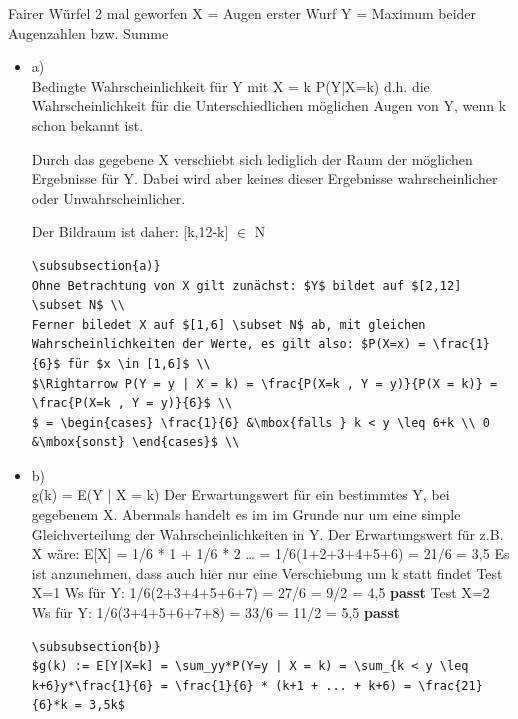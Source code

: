 \documentclass[11pt]{article}
\begin{document}
Fairer Würfel 2 mal geworfen
X = Augen erster Wurf
Y = Maximum beider Augenzahlen bzw. Summe
\begin{itemize}

\item a)\\
\label{sec-3-8-3-1}%
Bedingte Wahrscheinlichkeit für Y mit X = k
P(Y|X=k)
d.h. die Wahrscheinlichkeit für die Unterschiedlichen
möglichen Augen von Y, wenn k schon bekannt ist.

Durch das gegebene X verschiebt sich lediglich der Raum
der möglichen Ergebnisse für Y. Dabei wird aber keines
dieser Ergebnisse wahrscheinlicher oder Unwahrscheinlicher.

Der Bildraum ist daher: [k,12-k] $\in$ N

\begin{verbatim}
\subsubsection{a)}
Ohne Betrachtung von X gilt zunächst: $Y$ bildet auf $[2,12] \subset N$ \\
Ferner biledet X auf $[1,6] \subset N$ ab, mit gleichen Wahrscheinlichkeiten der Werte, es gilt also: $P(X=x) = \frac{1}{6}$ für $x \in [1,6]$ \\
$\Rightarrow P(Y = y | X = k) = \frac{P(X=k , Y = y)}{P(X = k)} = \frac{P(X=k , Y = y)}{6}$ \\
$ = \begin{cases} \frac{1}{6} &\mbox{falls } k < y \leq 6+k \\ 0 &\mbox{sonst} \end{cases}$ \\
\end{verbatim}

\item b)\\
\label{sec-3-8-3-2}%
g(k) = E(Y | X = k) Der Erwartungswert für ein bestimmtes Y, bei gegebenem X.
Abermals handelt es im im Grunde nur um eine simple Gleichverteilung der Wahrscheinlichkeiten in Y.
Der Erwartungswert für z.B. X wäre: E[X] = 1/6 * 1 + 1/6 * 2 \ldots{} = 1/6(1+2+3+4+5+6) = 21/6 = 3,5
Es ist anzunehmen, dass auch hier nur eine Verschiebung um k statt findet
Test X=1 Ws für Y: 1/6(2+3+4+5+6+7) = 27/6 = 9/2 = 4,5  \textbf{passt}
Test X=2 Ws für Y: 1/6(3+4+5+6+7+8) = 33/6 = 11/2 = 5,5 \textbf{passt}

\begin{verbatim}
\subsubsection{b)}
$g(k) := E[Y|X=k] = \sum_yy*P(Y=y | X = k) = \sum_{k < y \leq k+6}y*\frac{1}{6} = \frac{1}{6} * (k+1 + ... + k+6) = \frac{21}{6}*k = 3,5k$
\end{verbatim}



\end{itemize}
\end{document}
